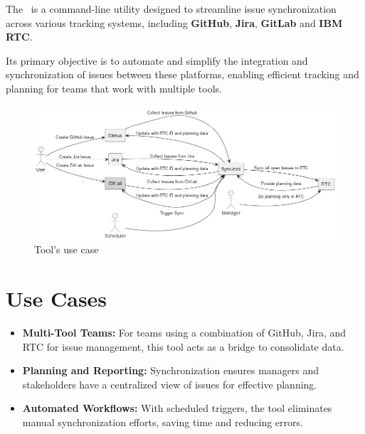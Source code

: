 



The \pkg\ is a command-line utility designed to streamline issue synchronization 
across various tracking systems, including \textbf{GitHub}, \textbf{Jira}, 
\textbf{GitLab} and \textbf{IBM RTC}. 

Its primary objective is to automate and simplify the integration and 
synchronization of issues between these platforms, enabling efficient tracking 
and planning for teams that work with multiple tools.

\begin{figure}[h!]
   \includegraphics[width=1\linewidth]{./pictures/usecase_diagram.png}
   \caption{Tool's use case}
\end{figure}

\section{Use Cases}

\begin{itemize}
    \item \textbf{Multi-Tool Teams:} For teams using a combination of GitHub, 
          Jira, and RTC for issue management, this tool acts as a bridge to 
          consolidate data.
    \item \textbf{Planning and Reporting:} Synchronization ensures managers and 
          stakeholders have a centralized view of issues for effective planning.
    \item \textbf{Automated Workflows:} With scheduled triggers, the tool 
          eliminates manual synchronization efforts, saving time and reducing 
          errors.
\end{itemize}

